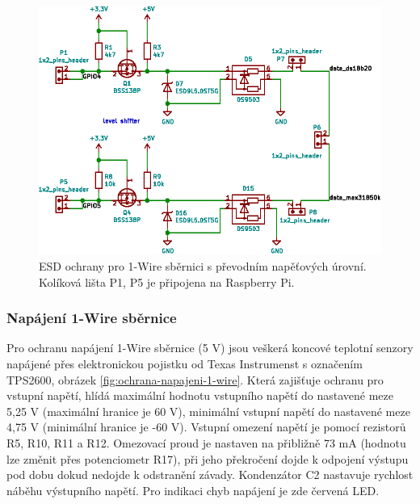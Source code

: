 \begin{figure}[H]
    \centering
    \includegraphics[width=\textwidth]{images/svg/kicad/ochrany-1-wire.eps}
    \caption[ESD ochrany pro 1-Wire sběrnici s převodním napěťových úrovní]{ESD ochrany pro 1-Wire sběrnici s převodním napěťových úrovní. Kolíková lišta P1, P5 je připojena na Raspberry Pi.}
    \label{fig:ochrany-1-wire}
\end{figure}


\subsubsection{Napájení 1-Wire sběrnice}
\label{sec:napajeni-1-wire-sbernice}
Pro ochranu napájení 1-Wire sběrnice (5 V) jsou veškerá koncové teplotní senzory napájené přes elektronickou pojistku od Texas Instrumenst s označením TPS2600, obrázek \ref{fig:ochrana-napajeni-1-wire}. Která zajišťuje ochranu pro vstupní napětí, hlídá maximální hodnotu vstupního napětí do nastavené meze 5,25 V (maximální hranice je 60 V), minimální vstupní napětí do nastavené meze 4,75 V (minimální hranice je -60 V). Vstupní omezení napětí je pomocí rezistorů R5, R10, R11 a R12. Omezovací proud je nastaven na přibližně 73 mA (hodnotu lze změnit přes potenciometr R17), při jeho překročení dojde k odpojení výstupu pod dobu dokud nedojde k odstranění závady. Kondenzátor C2 nastavuje rychlost náběhu výstupního napětí. Pro indikaci chyb napájení je zde červená LED.


